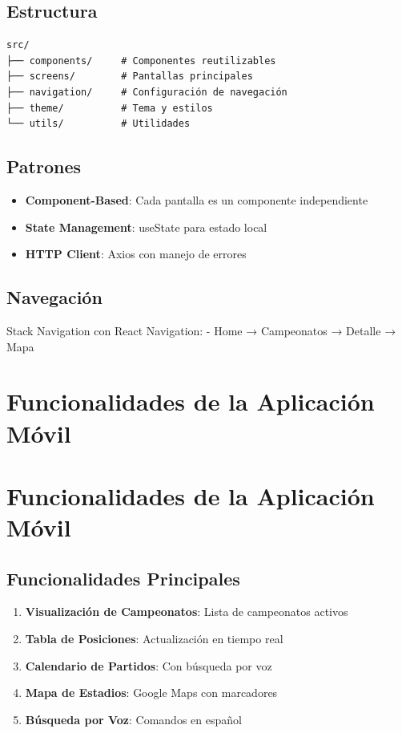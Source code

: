 \documentclass[
  spanish,
  11pt,
  letterpaper,
]{book}
\providecommand{\tightlist}{%
  \setlength{\itemsep}{0pt}\setlength{\parskip}{0pt}}
\begin{document}
\section{Estructura}\label{estructura}

\begin{verbatim}
src/
├── components/     # Componentes reutilizables
├── screens/        # Pantallas principales
├── navigation/     # Configuración de navegación
├── theme/          # Tema y estilos
└── utils/          # Utilidades
\end{verbatim}

\section{Patrones}\label{patrones}

\begin{itemize}
\tightlist
\item
  \textbf{Component-Based}: Cada pantalla es un componente independiente
\item
  \textbf{State Management}: useState para estado local
\item
  \textbf{HTTP Client}: Axios con manejo de errores
\end{itemize}

\section{Navegación}\label{navegaciuxf3n}

Stack Navigation con React Navigation: - Home → Campeonatos → Detalle →
Mapa

\chapter{Funcionalidades de la Aplicación
Móvil}\label{funcionalidades-de-la-aplicaciuxf3n-muxf3vil}

\chapter{Funcionalidades de la Aplicación
Móvil}\label{funcionalidades-de-la-aplicaciuxf3n-muxf3vil-1}

\section{Funcionalidades Principales}\label{funcionalidades-principales}

\begin{enumerate}
\def\labelenumi{\arabic{enumi}.}
\tightlist
\item
  \textbf{Visualización de Campeonatos}: Lista de campeonatos activos
\item
  \textbf{Tabla de Posiciones}: Actualización en tiempo real
\item
  \textbf{Calendario de Partidos}: Con búsqueda por voz
\item
  \textbf{Mapa de Estadios}: Google Maps con marcadores
\item
  \textbf{Búsqueda por Voz}: Comandos en español
\end{enumerate}
\end{document}
